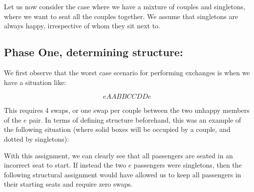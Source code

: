 \documentclass[a4paper]{article}
\begin{document}
Let us now consider the case where we have a mixture of couples and singletons, where we want to seat all the couples together. We assume that singletons are always happy, irrespective of whom they sit next to.

\subsection{Phase One, determining structure:} 

We first observe that the worst case scenario for performing exchanges is when we have a situation like:

\begin{equation*}
eAABBCCDDe
\end{equation*}

This requires 4 swaps, or one swap per couple between the two unhappy members of the $e$ pair.  In terms of defining structure beforehand, this was an example of the following situation (where solid boxes will be occupied by a couple, and dotted by singletons):

\begin{figure}[H]
\centering
{}
\end{figure}

With this assignment, we can clearly see that all passengers are seated in an incorrect seat to start. If instead the two $e$ passengers were singletons, then the following structural assignment would have allowed us to keep all passengers in their starting seats and require zero swaps.

\begin{figure}[H]
\centering
{}
\end{figure}
\end{document}
